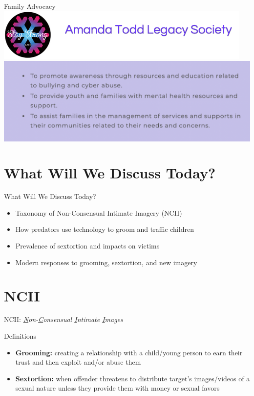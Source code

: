 \documentclass[nobackground,dvipsnames,table,aspectratio=169]{beamer}
\begin{document}
\begin{frame}{Family Advocacy}
    \centering
    \includegraphics[width=\textwidth]{amanda-todd-legacy-society}
    \includegraphics[width=\textwidth]{amanda-todd-legacy-society-mission}
\end{frame}

\section{What Will We Discuss Today?}

\begin{frame}{What Will We Discuss Today?}
    \large
    \begin{itemize}
        \item Taxonomy of Non-Consensual Intimate Imagery (NCII)
        \item How predators use technology to groom and traffic children
        \item Prevalence of sextortion and impacts on victims
        \item Modern responses to grooming, sextortion, and new imagery
    \end{itemize}
\end{frame}

\section{NCII}

\begin{frame}{NCII:}
    \centering
    \LARGE
    \textit{\underline{N}on-\underline{C}onsensual \underline{I}ntimate \underline{I}mages}
\end{frame}

\begin{frame}{Definitions}
    \large
    \begin{itemize}
        \item \textbf{Grooming:} creating a relationship with a child/young person  to earn their trust and then exploit and/or abuse them
        \item \textbf{Sextortion:} when offender threatens to distribute target’s  images/videos of a sexual nature unless they provide them with money or sexual favors
    \end{itemize}
\end{frame}
\end{document}
